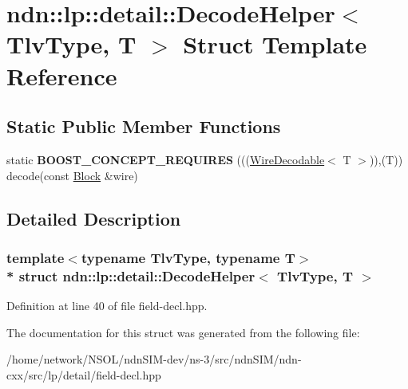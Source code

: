 \hypertarget{structndn_1_1lp_1_1detail_1_1DecodeHelper}{}\section{ndn\+:\+:lp\+:\+:detail\+:\+:Decode\+Helper$<$ Tlv\+Type, T $>$ Struct Template Reference}
\label{structndn_1_1lp_1_1detail_1_1DecodeHelper}
\subsection*{Static Public Member Functions}
\begin{DoxyCompactItemize}
\item 
static {\bfseries B\+O\+O\+S\+T\+\_\+\+C\+O\+N\+C\+E\+P\+T\+\_\+\+R\+E\+Q\+U\+I\+R\+ES} (((\hyperlink{classndn_1_1WireDecodable}{Wire\+Decodable}$<$ T $>$)),(T)) decode(const \hyperlink{classndn_1_1Block}{Block} \&wire)\hypertarget{structndn_1_1lp_1_1detail_1_1DecodeHelper_a7872b174b35a9b8af76b4aa5928defab}{}\label{structndn_1_1lp_1_1detail_1_1DecodeHelper_a7872b174b35a9b8af76b4aa5928defab}

\end{DoxyCompactItemize}


\subsection{Detailed Description}
\subsubsection*{template$<$typename Tlv\+Type, typename T$>$\\*
struct ndn\+::lp\+::detail\+::\+Decode\+Helper$<$ Tlv\+Type, T $>$}



Definition at line 40 of file field-\/decl.\+hpp.



The documentation for this struct was generated from the following file\+:\begin{DoxyCompactItemize}
\item 
/home/network/\+N\+S\+O\+L/ndn\+S\+I\+M-\/dev/ns-\/3/src/ndn\+S\+I\+M/ndn-\/cxx/src/lp/detail/field-\/decl.\+hpp\end{DoxyCompactItemize}
